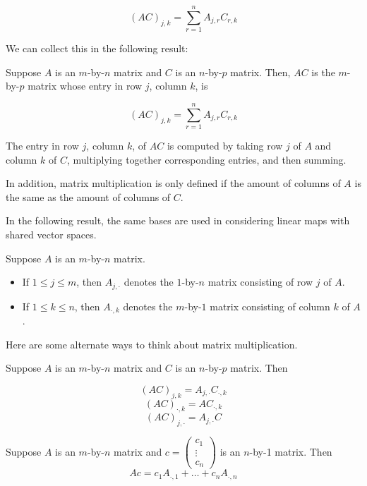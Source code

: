 \[ (AC)_{j,k} = \sum_{r=1}^n A_{j,r} C_{r,k} \]

We can collect this in the following result:

\begin{definition}
   Suppose $A$ is an $m$-by-$n$ matrix and $C$ is an $n$-by-$p$ matrix.
   Then, $AC$ is the $m$-by-$p$ matrix whose entry in row $j$, column
   $k$, is

   \[ (AC)_{j,k} = \sum_{r=1}^n A_{j,r} C_{r,k} \]
\end{definition}

The entry in row $j$, column $k$, of $AC$ is computed
by taking row $j$ of $A$ and column $k$ of $C$, multiplying
together corresponding entries, and then summing.

In addition, matrix multiplication is only defined if
the amount of columns of $A$ is the same as the amount
of columns of $C$.

In the following result, the same bases are used in considering
linear maps with shared vector spaces.

\begin{definition}
   Suppose $A$ is an $m$-by-$n$ matrix.
   \begin{itemize}
      \item If $1 \leq j \leq m$, then $A_{j, \cdot}$ denotes
      the $1$-by-$n$ matrix consisting of row $j$ of $A$.
      \item If $1 \leq k \leq n$, then $A_{\cdot, k}$ denotes
      the $m$-by-$1$ matrix consisting of column $k$ of $A$.
   \end{itemize}
\end{definition}

Here are some alternate ways to think about matrix multiplication.

\begin{theorem} 
   Suppose $A$ is an $m$-by-$n$ matrix and $C$ is an $n$-by-$p$ matrix. Then

   \[ (AC)_{j,k} = A_{j, \cdot} C_{\cdot, k} \]
   \[ (AC)_{\cdot, k} = AC_{\cdot, k} \]
   \[ (AC)_{j, \cdot} = A_{j, \cdot} C \]
\end{theorem}

\begin{theorem} 
   Suppose $A$ is an $m$-by-$n$ matrix and $c = \begin{pmatrix*} c_1 \\ \vdots \\ c_n \end{pmatrix*}$
   is an $n$-by-1 matrix. Then \[Ac = c_1 A_{\cdot, 1} + \dots + c_n A_{\cdot, n}\]
\end{theorem}

